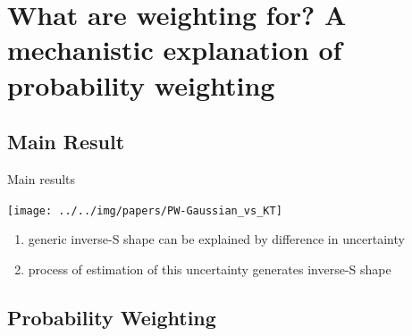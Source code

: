 \section[Probability Weighting]{What are weighting for? A mechanistic explanation of probability weighting}
\subsection{Main Result}

\begin{frame}{Main results}
\begin{center}
	\texttt{[image: ../../img/papers/PW-Gaussian\_vs\_KT]}
\end{center}
\begin{enumerate}
	\item	generic inverse-S shape can be explained by difference in uncertainty
	\item process of estimation of this uncertainty generates inverse-S shape
\end{enumerate}
\label{MainResults}
\hyperlink{weight_vs_estimate}{}
\end{frame}

\subsection{Probability Weighting}

